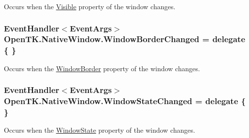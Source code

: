Occurs when the \hyperlink{class_open_t_k_1_1_native_window_aff1fe36bb34bb3ba53814a7aaceea940}{Visible} property of the window changes. 

\hypertarget{class_open_t_k_1_1_native_window_a1e42d7762769cd074dfb68496b0b2dbf}{
\subsubsection[{Window\-Border\-Changed}]{\setlength{\rightskip}{0pt plus 5cm}Event\-Handler$<$Event\-Args$>$ Open\-T\-K.\-Native\-Window.\-Window\-Border\-Changed = delegate \{ \}}}\label{class_open_t_k_1_1_native_window_a1e42d7762769cd074dfb68496b0b2dbf}


Occurs when the \hyperlink{class_open_t_k_1_1_native_window_a847af2dd07cb323f3a96767bb96ea44b}{Window\-Border} property of the window changes. 

\hypertarget{class_open_t_k_1_1_native_window_a911c577473fdc8b422419e4677350c0f}{
\subsubsection[{Window\-State\-Changed}]{\setlength{\rightskip}{0pt plus 5cm}Event\-Handler$<$Event\-Args$>$ Open\-T\-K.\-Native\-Window.\-Window\-State\-Changed = delegate \{ \}}}\label{class_open_t_k_1_1_native_window_a911c577473fdc8b422419e4677350c0f}


Occurs when the \hyperlink{class_open_t_k_1_1_native_window_a78e6278aa092a82f672ff838ac7c1e2d}{Window\-State} property of the window changes. 


